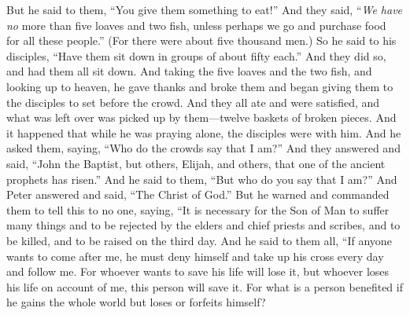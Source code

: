 \begin{biblechapter}
\verse But he said to them, “You give them something to eat!” And they said, “\textit{We have no} more than five loaves and two fish, unless perhaps we go and purchase food for all these people.”
\verse (For there were about five thousand men.) So he said to his disciples, “Have them sit down in groups of about fifty each.”
\verse And they did so, and had them all sit down.
\verse And taking the five loaves and the two fish, and looking up to heaven, he gave thanks and broke them and began giving them to the disciples to set before the crowd.
\verse And they all ate and were satisfied, and what was left over was picked up by them—twelve baskets of broken pieces.
 And it happened that while he was praying alone, the disciples were with him. And he asked them, saying, “Who do the crowds say that I am?”
\verse And they answered and said, “John the Baptist, but others, Elijah, and others, that one of the ancient prophets has risen.”
\verse And he said to them, “But who do you say that I am?” And Peter answered and said, “The Christ of God.”
 But he warned and commanded them to tell this to no one,
\verse saying, “It is necessary for the Son of Man to suffer many things and to be rejected by the elders and chief priests and scribes, and to be killed, and to be raised on the third day.
 And he said to them all, “If anyone wants to come after me, he must deny himself and take up his cross every day and follow me.
\verse For whoever wants to save his life will lose it, but whoever loses his life on account of me, this person will save it.
\verse For what is a person benefited if he gains the whole world but loses or forfeits himself?

\end{biblechapter}
